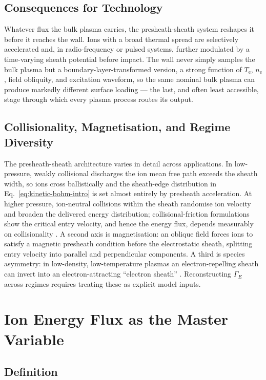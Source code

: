 \subsection{Consequences for Technology}

Whatever flux the bulk plasma carries, the presheath-sheath system reshapes it before it reaches the wall. Ions with a broad thermal spread are selectively accelerated and, in radio-frequency or pulsed systems, further modulated by a time-varying sheath potential before impact. The wall never simply samples the bulk plasma but a boundary-layer-transformed version, a strong function of $T_{\mathrm{e}}$, $n_{\mathrm{e}}$, field obliquity, and excitation waveform, so the same nominal bulk plasma can produce markedly different surface loading — the last, and often least accessible, stage through which every plasma process routes its output.

\subsection{Collisionality, Magnetisation, and Regime Diversity}

The presheath-sheath architecture varies in detail across applications. In low-pressure, weakly collisional discharges the ion mean free path exceeds the sheath width, so ions cross ballistically and the sheath-edge distribution in Eq.~\eqref{eq:kinetic-bohm-intro} is set almost entirely by presheath acceleration. At higher pressure, ion-neutral collisions within the sheath randomise ion velocity and broaden the delivered energy distribution; collisional-friction formulations show the critical entry velocity, and hence the energy flux, depends measurably on collisionality \cite{ref0024}. A second axis is magnetisation: an oblique field forces ions to satisfy a magnetic presheath condition before the electrostatic sheath, splitting entry velocity into parallel and perpendicular components. A third is species asymmetry: in low-density, low-temperature plasmas an electron-repelling sheath can invert into an electron-attracting ``electron sheath'' \cite{ref0006}. Reconstructing $\Gamma_E$ across regimes requires treating these as explicit model inputs.

\section{Ion Energy Flux as the Master Variable}

\subsection{Definition}

